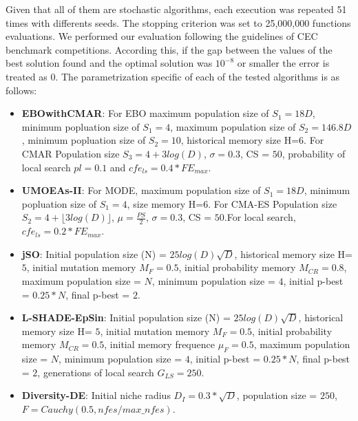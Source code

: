 Given that all of them are stochastic algorithms, each execution was repeated 51 times with differents seeds.
%
The stopping criterion was set to 25,000,000 functions evaluations.
%
We performed our evaluation following the guidelines of CEC benchmark competitions.
%
According this, if the gap between the values of the best solution found and the optimal solution was $10^{-8}$ or smaller the error is treated as $0$.
%
%
The parametrization specific of each of the tested algorithms is as follows:
\begin{itemize}
\item \textbf{EBOwithCMAR}: For EBO maximum population size of $S_1 = 18D$, minimum popluation size of $S_1 = 4$, maximum population size of $S_2 = 146.8D$, minimum popluation size of $S_2 = 10$, historical memory size H=$6$. For CMAR Population size $S_3 = 4 + 3log(D)$, $\sigma=0.3$, CS = $50$, probability of local search $pl = 0.1$ and $cfe_{ls} = 0.4* FE_{max}$.
\item \textbf{UMOEAs-II}: For MODE, maximum population size of $S_1 = 18D$, minimum popluation size of $S_1 = 4$, size memory H=$6$. For CMA-ES Population size $S_2 = 4 + \lfloor 3log(D) \rfloor$, $\mu=\frac{PS}{2}$, $\sigma=0.3$, CS = $50$.For local search, $cfe_{ls} = 0.2 * FE_{max}$.
\item \textbf{jSO}: Initial population size (N) = $25log(D)\sqrt{D}$, historical memory size H= $5$, initial mutation memory $M_F = 0.5$, initial probability memory $M_{CR} = 0.8$, maximum population size = $N$, minimum population size = $4$, initial p-best = $0.25*N$, final p-best = $2$.
\item \textbf{L-SHADE-EpSin}: Initial population size (N) = $25log(D)\sqrt{D}$, historical memory size H= $5$, initial mutation memory $M_F = 0.5$, initial probability memory $M_{CR} = 0.5$, initial memory frequence $\mu_F = 0.5$, maximum population size = $N$, minimum population size = $4$, initial p-best = $0.25*N$, final p-best = $2$, generations of local search $G_{LS}=250$.
\item \textbf{Diversity-DE}: Initial niche radius $D_I = 0.3*\sqrt{D}$, population size = $250$, $F = Cauchy(0.5, nfes/max\_nfes)$.
\end{itemize}
%

